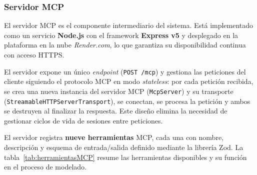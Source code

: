 \subsubsection{Servidor MCP}

El servidor MCP es el componente intermediario del sistema. Está implementado como un servicio \textbf{Node.js} con el framework \textbf{Express v5} y desplegado en la plataforma en la nube \textit{Render.com}, lo que garantiza su disponibilidad continua con acceso HTTPS.

El servidor expone un único \textit{endpoint} (\texttt{POST /mcp}) y gestiona las peticiones del cliente siguiendo el protocolo MCP en modo \textit{stateless}: por cada petición recibida, se crea una nueva instancia del servidor MCP (\texttt{McpServer}) y su transporte (\texttt{StreamableHTTPServerTransport}), se conectan, se procesa la petición y ambos se destruyen al finalizar la respuesta. Este diseño elimina la necesidad de gestionar ciclos de vida de sesiones entre peticiones.

El servidor registra \textbf{nueve herramientas} MCP, cada una con nombre, descripción y esquema de entrada/salida definido mediante la librería Zod. La tabla~\ref{tab:herramientasMCP} resume las herramientas disponibles y su función en el proceso de modelado.

